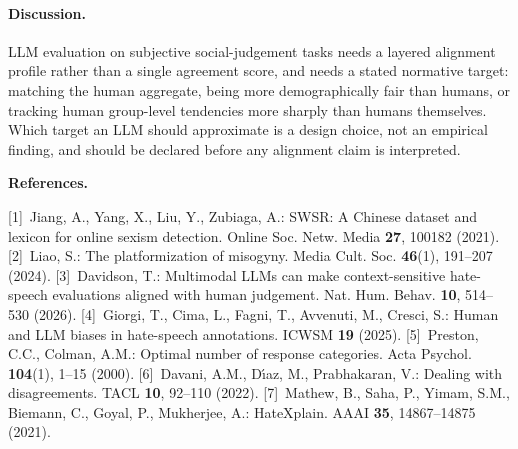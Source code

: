 \documentclass[runningheads]{llncs}
\begin{document}
\enlargethispage{8\baselineskip}

\paragraph{Discussion.}
LLM evaluation on subjective social-judgement tasks needs a layered alignment profile rather than a single agreement score, and needs a stated normative target: matching the human aggregate, being more demographically fair than humans, or tracking human group-level tendencies more sharply than humans themselves. Which target an LLM should approximate is a design choice, not an empirical finding, and should be declared before any alignment claim is interpreted.

\vspace{0.3ex}
\noindent\textbf{References.}
{\scriptsize
[1]~Jiang, A., Yang, X., Liu, Y., Zubiaga, A.: SWSR: A Chinese dataset and lexicon for online sexism detection. Online Soc. Netw. Media \textbf{27}, 100182 (2021).
[2]~Liao, S.: The platformization of misogyny. Media Cult. Soc. \textbf{46}(1), 191--207 (2024).
[3]~Davidson, T.: Multimodal LLMs can make context-sensitive hate-speech evaluations aligned with human judgement. Nat. Hum. Behav. \textbf{10}, 514--530 (2026).
[4]~Giorgi, T., Cima, L., Fagni, T., Avvenuti, M., Cresci, S.: Human and LLM biases in hate-speech annotations. ICWSM \textbf{19} (2025).
[5]~Preston, C.C., Colman, A.M.: Optimal number of response categories. Acta Psychol. \textbf{104}(1), 1--15 (2000).
[6]~Davani, A.M., D\'{\i}az, M., Prabhakaran, V.: Dealing with disagreements. TACL \textbf{10}, 92--110 (2022).
[7]~Mathew, B., Saha, P., Yimam, S.M., Biemann, C., Goyal, P., Mukherjee, A.: HateXplain. AAAI \textbf{35}, 14867--14875 (2021).
\par}
\end{document}
